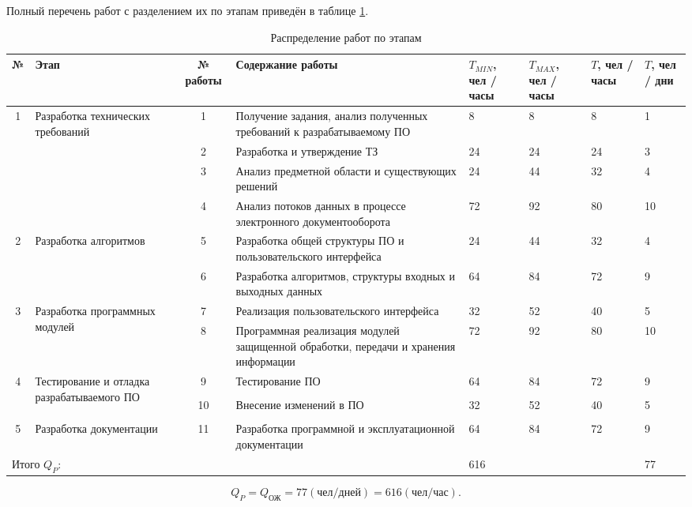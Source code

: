 \vspace{\baselineskip}
Полный перечень работ с разделением их по этапам приведён в таблице \ref{table:works}.
\begin{table} [h!]
  \centering
  \parbox{15cm}{\caption{Распределение работ по этапам}\label{table:works}}
 \begin{center}
  \begin{tabular}{| c | m{3cm} | c | m{5cm} | m{1cm} | m{1cm} | m{1cm} | m{1cm} |}
  \hline
 \rowcolor{Gray} №  &\centering Этап &\centering № работы &\centering  Содержание работы &\centering $T_{MIN}$, чел / часы &\centering $T_{MAX}$, чел / часы &\centering $T$, чел / часы &\centering $T$, чел / дни \tabularnewline \hline

\multirow{4}{*}{1} 	& \multirow{4}{3cm}{Разработка технических требований}	& 1 & Получение задания, анализ полученных требований к разрабатываемому ПО		& 8 & 8	& 8	& 1 \\ \cline{3-8}
 	& & 2 & Разработка и утверждение ТЗ 	& 24 & 24 & 24 & 3 \\ \cline{3-8}
 	& & 3 & Анализ предметной области и существующих решений & 24 & 44 & 32  & 4 \\ \cline{3-8}
 	& & 4 & Анализ потоков данных в процессе электронного документооборота & 72 & 92 & 80 & 10 \\ \hline

\multirow{2}{*}{2} & \multirow{2}{3cm}{Разработка алгоритмов} & 5 & Разработка общей структуры ПО и пользовательского интерфейса & 24 & 44 & 32 & 4 \\ \cline{3-8}
	& & 6 & Разработка алгоритмов, структуры входных и выходных данных & 64 & 84 & 72 & 9 \\ \hline

\multirow{2}{*}{3} & \multirow{2}{3cm}{Разработка программных модулей} & 7 & Реализация пользовательского интерфейса & 32 & 52 & 40 & 5 \\ \cline{3-8}
	& & 8 & Программная реализация модулей защищенной обработки, передачи и хранения информации & 72 & 92 & 80 & 10 \\ \hline

\multirow{4}{*}{4} & \multirow{4}{3cm}{Тестирование и отладка разрабатываемого ПО} & 9 & Тестирование ПО & 64 & 84 & 72 & 9 \\ \cline{3-8}
	& & & & & & & \\
	& & 10 & Внесение изменений в ПО & 32 & 52 & 40 & 5 \\
	& & & & & & & \\ \hline

5 & Разработка документации & 11 & Разработка программной и эксплуатационной документации & 64 & 84 & 72 & 9 \\ \hline

\multicolumn{4}{|l|}{Итого $Q_P$:} & \multicolumn{3}{|l|}{616} & 77 \\ \hline
   \end{tabular}
 \end{center}
\end{table}

 $$
Q_P = Q_{\textrm{ОЖ}} = 77 (\textrm{чел/дней}) = 616 (\textrm{чел/час}).
 $$